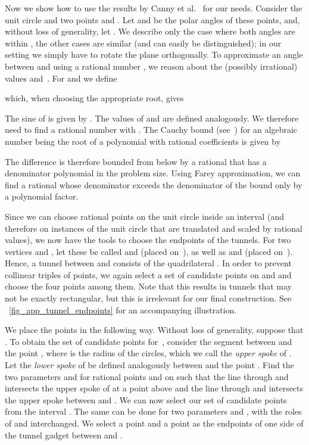 \documentclass[11pt,a4paper]{article}
\begin{document}
Now we show how to use the results by Canny et al.~\cite{canny} for our needs.
Consider the unit circle and two points  and .
Let  and  be the polar angles of these points, and, without loss of generality, let .
We describe only the case where both angles are within , the other cases are similar (and can easily be distinguished);
in our setting we simply have to rotate the plane orthogonally.
To approximate an angle between  and  using a rational number , we reason about the (possibly irrational) values  and~.
For  and  we define

which, when choosing the appropriate root, gives

The sine of  is given by .
The values of  and  are defined analogously.
We therefore need to find a rational number  with .
The Cauchy bound (see~\cite{yap}) for an algebraic number  being the root of a polynomial  with rational coefficients  is given by

The difference  is therefore bounded from below by a rational that has a denominator polynomial in the problem size.
{Using Farey approximation, we can find a rational  whose denominator exceeds the denominator of the bound only by a polynomial factor.}


Since we can choose rational points on the unit circle inside an interval (and therefore on instances of the unit circle that are translated and scaled by rational values), we now have the tools to choose the endpoints of the tunnels.
For two vertices  and , let these be called  and  (placed on~), as well as  and  (placed on~).
Hence, a tunnel between  and  consists of the quadrilateral .
In order to prevent collinear triples of points, we again select a set of candidate points on  and  and choose the four points among them.
Note that this results in tunnels that may not be exactly rectangular, but this is irrelevant for our final construction.
See \figurename~\ref{fig_app_tunnel_endpoints} for an accompanying illustration.

We place the points in the following way.
Without loss of generality, suppose that .
To obtain the set of candidate points for~, consider the segment between  and the point , where  is the radius of the circles, which we call the \emph{upper spoke} of .
Let the \emph{lower spoke} of  be defined analogously between  and the point .
Find the two parameters  and  for rational points  and  on  such that the line through  and  intersects the upper spoke of  at a point above  and the line through  and  intersects the upper spoke between  and .
We can now select our set  of candidate points from the interval .
The same can be done for two parameters  and , with the roles of  and  interchanged.
We select a point  and a point  as the endpoints of one side of the tunnel gadget between  and .
\end{document}
